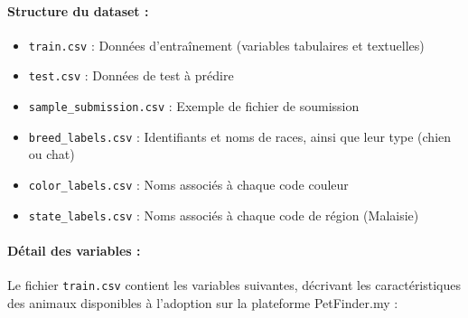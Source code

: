 \documentclass[a4paper,12pt]{article}
\begin{document}
\paragraph{Structure du dataset :}
\begin{itemize}
    \item \texttt{train.csv} : Données d'entraînement (variables tabulaires et textuelles)
    \item \texttt{test.csv} : Données de test à prédire
    \item \texttt{sample\_submission.csv} : Exemple de fichier de soumission
    \item \texttt{breed\_labels.csv} : Identifiants et noms de races, ainsi que leur type (chien ou chat)
    \item \texttt{color\_labels.csv} : Noms associés à chaque code couleur
    \item \texttt{state\_labels.csv} : Noms associés à chaque code de région (Malaisie)
\end{itemize}

\paragraph{Détail des variables :}

Le fichier \texttt{train.csv} contient les variables suivantes, décrivant les caractéristiques des animaux disponibles à l’adoption sur la plateforme PetFinder.my :
\end{document}
